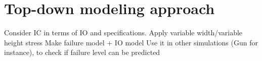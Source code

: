 \section{Top-down modeling approach}

Consider IC in terms of IO and specifications.
Apply variable width/variable height stress
Make failure model + IO model
Use it in other simulations (Gun for instance), to check if failure level can be predicted

